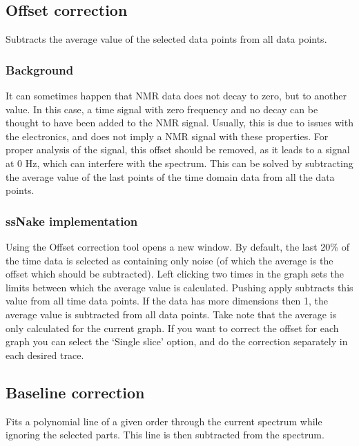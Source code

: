 \documentclass[11pt,a4paper]{article}
\begin{document}
\subsection{Offset correction}
Subtracts the average value of the selected data points from all data points.

\subsubsection*{Background}
It can sometimes happen that NMR data does not decay to zero, but to another value. In this case, a time signal with zero frequency and no decay can be thought to have been added to the NMR signal. Usually, this is due to issues with the electronics, and does not imply a NMR signal with these properties. For proper analysis of the signal, this offset should be removed, as it leads to a signal at 0 Hz, which can interfere with the spectrum. This can be solved by subtracting the average value of the last points of the time domain data from all the data points.

\subsubsection*{ssNake implementation}
Using the Offset correction tool opens a new window. By default, the last 20\% of the time data is selected as containing only noise (of which the average is the offset which should be subtracted). Left clicking two times in the graph sets the limits between which the average value is calculated. Pushing apply subtracts this value from all time data points. If the data has more dimensions then 1, the average value is subtracted from all data points. Take note that the average is only calculated for the current graph. If you want to correct the offset for each graph you can select the `Single slice' option, and do the correction separately in each desired trace.

\subsection{Baseline correction}
Fits a polynomial line of a given order through the current spectrum while ignoring the selected parts. This line is then subtracted from the spectrum.
\end{document}
